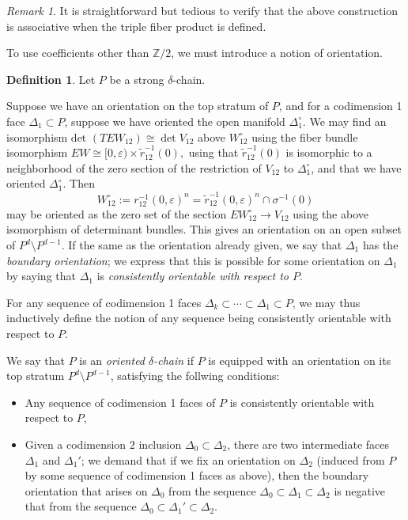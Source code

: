\documentclass[10pt,a4paper]{amsart}
\theoremstyle{definition}
\newtheorem{definition}[theorem]{Definition}
\theoremstyle{remark}
\newtheorem{remark}[theorem]{Remark}
\numberwithin{figure}{qchap}
\begin{document}
\begin{remark}\label{rmk:assoc}
It is straightforward but tedious to verify that the above construction is associative when the triple fiber product is defined. 
\end{remark}

To use coefficients other than $\mathbb Z/2$, we must introduce a notion of orientation.
\begin{definition}Let $P$ be a strong $\delta$-chain.

Suppose we have an orientation on the top stratum of $P$, and for a codimension 1 face $\Delta_1 \subset P$, suppose we have oriented the open manifold $\Delta_1^\circ$. We may find an isomorphism $\text{det }(TEW_{12}) \cong \det{V_{12}}$ above $W_{12}^\circ$ using the fiber bundle isomorphism $EW \cong [0,\varepsilon) \times \tilde r_{12}^{-1}(0),$ using that $\tilde r_{12}^{-1}(0)$ is isomorphic to a neighborhood of the zero section of the restriction of $V_{12}$ to $\Delta_1^\circ$, and that we have oriented $\Delta_1^\circ$. Then
$$W_{12}^\circ := r_{12}^{-1}(0, \varepsilon)^n = \tilde r_{12}^{-1}(0, \varepsilon)^n \cap \sigma^{-1}(0)$$
may be oriented as the zero set of the section $EW_{12}^\circ \to V_{12}$ using the above isomorphism of determinant bundles. This gives an orientation on an open subset of $P^d \setminus P^{d-1}$. If the same as the orientation already given, we say that $\Delta_1$ has the \emph{boundary orientation}; we express that this is possible for some orientation on $\Delta_1$ by saying that $\Delta_1$ is \emph{consistently orientable with respect to $P$}.

For any sequence of codimension 1 faces $\Delta_k \subset \cdots \subset \Delta_1 \subset P$, we may thus inductively define the notion of any sequence being consistently orientable with respect to $P$. 

We say that $P$ is an \emph{oriented $\delta$-chain} if $P$ is equipped with an orientation on its top stratum $P^d \setminus P^{d-1}$, satisfying the follwing conditions:
\begin{itemize}
\item Any sequence of codimension 1 faces of $P$ is consistently orientable with respect to $P$,
\item Given a codimension $2$ inclusion $\Delta_0 \subset \Delta_2$, there are two intermediate faces $\Delta_1$ and $\Delta_1'$; we demand that if we fix an orientation on $\Delta_2$ (induced from $P$ by some sequence of codimension 1 faces as above), then the boundary orientation that arises on $\Delta_0$ from the sequence $\Delta_0 \subset \Delta_1 \subset \Delta_2$ is negative that from the sequence $\Delta_0 \subset \Delta_1' \subset \Delta_2$. 
\end{itemize}
\end{definition}
\end{document}
